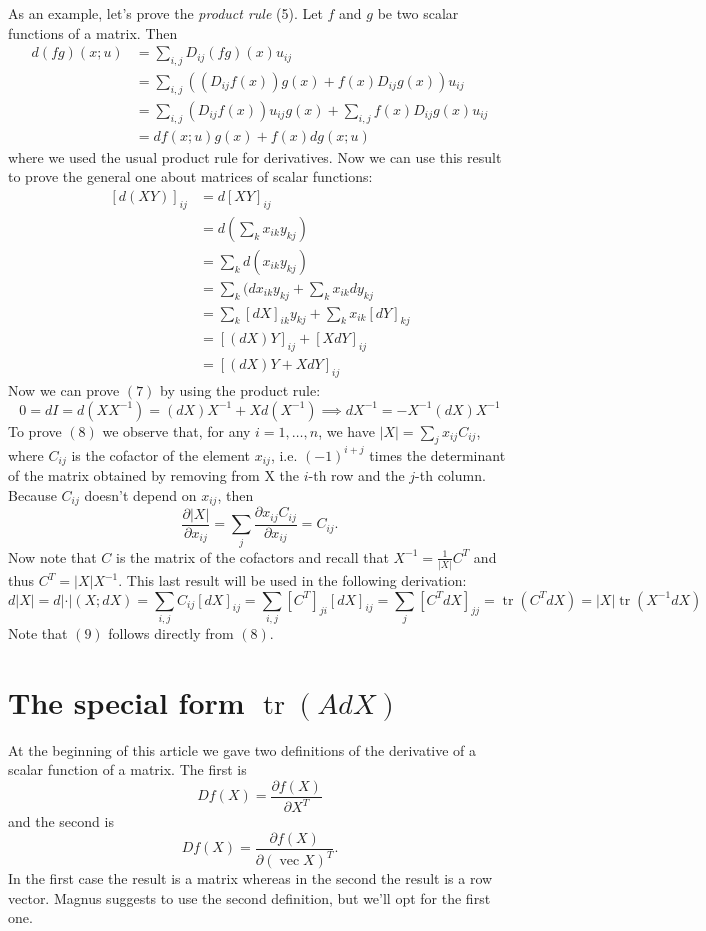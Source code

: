 \documentclass[a4paper,12pt]{article}
\begin{document}
As an example, let's prove the \emph{product rule} (5). Let $f$ and $g$ be two scalar functions of a matrix. Then
$$
\begin{align}
d(fg)(x;u) &= \sum_{i,j} D_{ij}(fg)(x)u_{ij} \\
 &= \sum_{i,j} ((D_{ij}f(x))g(x) + f(x)D_{ij}g(x))u_{ij} \\
 &= \sum_{i,j} (D_{ij}f(x))u_{ij} g(x) + \sum_{i,j} f(x)D_{ij}g(x)u_{ij} \\
 &= df(x;u)g(x) + f(x)dg(x;u)
\end{align}
$$ where we used the usual product rule for derivatives. Now we can use this result to prove the general one about matrices of scalar functions:
$$
\begin{align}
[d(XY)]_{ij} &= d[XY]_{ij} \\
 &= d\left( \sum_k x_{ik}y_{kj} \right) \\
 &= \sum_k d(x_{ik}y_{kj}) \\
 &= \sum_k (dx_{ik}y_{kj} + \sum_k x_{ik}dy_{kj} \\
 &= \sum_k [dX]_{ik} y_{kj} + \sum_k x_{ik}[dY]_{kj} \\
 &= [(dX)Y]_{ij} + [XdY]_{ij} \\
 &= [(dX)Y + XdY]_{ij}
\end{align}
$$ Now we can prove $(7)$ by using the product rule:
$$0 = dI = d(XX^{-1}) = (dX)X^{-1} + Xd(X^{-1}) \implies dX^{-1} = -X^{-1}(dX)X^{-1}
$$ To prove $(8)$ we observe that, for any $i=1,\ldots,n$, we have $|X| = \sum_j x_{ij}C_{ij}$, where $C_{ij}$ is the cofactor of the element $x_{ij}$, i.e. $(-1)^{i+j}$ times the determinant of the matrix obtained by removing from X the $i$-th row and the $j$-th column. Because $C_{ij}$ doesn't depend on $x_{ij}$, then
$$
\frac{\partial |X|}{\partial x_{ij}} = \sum_j \frac{\partial x_{ij}C_{ij}}{\partial x_{ij}} = C_{ij}.
$$ Now note that $C$ is the matrix of the cofactors and recall that $X^{-1} = \frac{1}{|X|}C^T$ and thus $C^T = |X|X^{-1}$. This last result will be used in the following derivation:
$$d|X| = d|\cdot|(X;dX) = \sum_{i,j}C_{ij}[dX]_{ij} = \sum_{i,j}[C^T]_{ji}[dX]_{ij} = \sum_j[C^TdX]_{jj} = \operatorname{tr}(C^TdX) = |X|\operatorname{tr}(X^{-1}dX)
$$ Note that $(9)$ follows directly from $(8)$.

\section{The special form $\operatorname{tr}(AdX)$}

At the beginning of this article we gave two definitions of the derivative of a scalar function of a matrix. The first is
$$ Df(X) = \frac{\partial f(X)}{\partial X^T}
$$ and the second is
$$ Df(X) = \frac{\partial f(X)}{\partial (\operatorname{vec}X)^T}.
$$ In the first case the result is a matrix whereas in the second the result is a row vector. Magnus suggests to use the second definition, but we'll opt for the first one.
\end{document}
